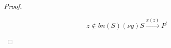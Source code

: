 \begin{proof}
\begin{description}
\begin{itemize}
\begin{description}
\[{		  z\notin bn(S)
	      }{
		(\nu y) S \xrightarrow{\overline{x}(z)} P^{'}
	      }
	    \]
	\end{description}

































































































	\end{itemize}
    \end{description}
  \end{proof}
